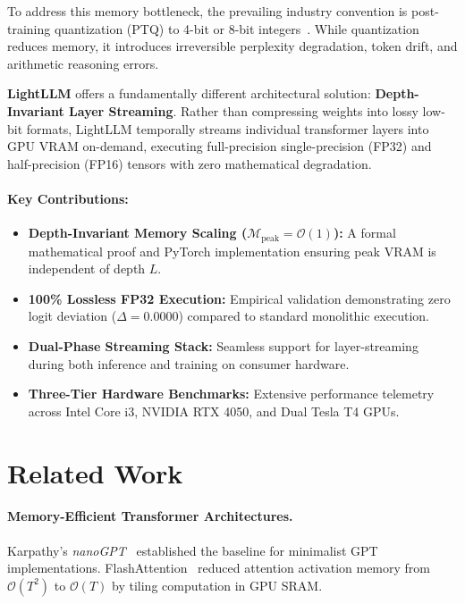 \documentclass[10pt,twocolumn,a4paper]{article}
\begin{document}
To address this memory bottleneck, the prevailing industry convention is post-training quantization (PTQ) to 4-bit or 8-bit integers~\citep{frantar2022gptq,lin2023awq}. While quantization reduces memory, it introduces irreversible perplexity degradation, token drift, and arithmetic reasoning errors. 

\textbf{LightLLM} offers a fundamentally different architectural solution: \textbf{Depth-Invariant Layer Streaming}. Rather than compressing weights into lossy low-bit formats, LightLLM temporally streams individual transformer layers into GPU VRAM on-demand, executing full-precision single-precision (FP32) and half-precision (FP16) tensors with zero mathematical degradation.

\paragraph{Key Contributions:}
\begin{itemize}
    \item \textbf{Depth-Invariant Memory Scaling ($\mathcal{M}_{\text{peak}} = \mathcal{O}(1)$):} A formal mathematical proof and PyTorch implementation ensuring peak VRAM is independent of depth $L$.
    \item \textbf{100\% Lossless FP32 Execution:} Empirical validation demonstrating zero logit deviation ($\Delta = 0.0000$) compared to standard monolithic execution.
    \item \textbf{Dual-Phase Streaming Stack:} Seamless support for layer-streaming during both inference and training on consumer hardware.
    \item \textbf{Three-Tier Hardware Benchmarks:} Extensive performance telemetry across Intel Core i3, NVIDIA RTX 4050, and Dual Tesla T4 GPUs.
\end{itemize}

\section{Related Work}
\label{sec:related}

\paragraph{Memory-Efficient Transformer Architectures.}
Karpathy's \emph{nanoGPT}~\citep{karpathy2022nanogpt} established the baseline for minimalist GPT implementations. FlashAttention~\citep{dao2022flashattention,dao2023flashattention2} reduced attention activation memory from $\mathcal{O}(T^2)$ to $\mathcal{O}(T)$ by tiling computation in GPU SRAM.
\end{document}
